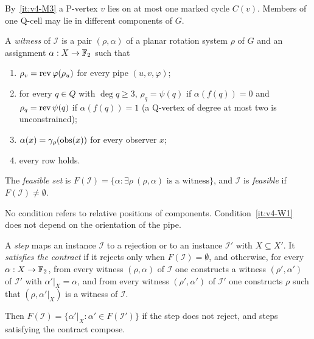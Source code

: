 By~\ref{it:v4-M3} a P-vertex $v$ lies on at most one marked cycle $C(v)$.
Members of one Q-cell may lie in
different components of $G$.

\begin{definition}[witness]\label{def:v4-witness}
A \emph{witness} of $\mathcal I$ is a pair $(\rho,\alpha)$ of a planar
rotation system $\rho$ of $G$ and an assignment $\alpha:X\to\mathbb F_2$ such that
\begin{enumerate}[label=(W\arabic*),nosep]
\item\label{it:v4-W1} $\rho_v=\operatorname{rev}\varphi(\rho_u)$ for every pipe
  $(u,v,\varphi)$;
\item\label{it:v4-W2} for every $q\in Q$ with $\deg q\ge3$,
  $\rho_q=\psi(q)$ if $\alpha(f(q))=0$ and $\rho_q=\operatorname{rev}\psi(q)$ if
  $\alpha(f(q))=1$ (a Q-vertex of degree at most two is unconstrained);
\item\label{it:v4-W3} $\alpha(x)=\gamma_\rho(\operatorname{obs}(x))$ for every
  observer $x$;
\item\label{it:v4-W4} every row holds.
\end{enumerate}
The \emph{feasible set} is $F(\mathcal I)=\{\alpha:\exists\rho\
(\rho,\alpha)\text{ is a witness}\}$, and $\mathcal I$ is \emph{feasible} if
$F(\mathcal I)\ne\emptyset$.
\end{definition}

No condition refers to relative positions of components.
Condition~\ref{it:v4-W1} does not depend on the orientation of the pipe.

\begin{definition}[contract]\label{def:v4-contract}
A \emph{step} maps an instance $\mathcal I$ to a rejection or to an instance
$\mathcal I'$ with $X\subseteq X'$. It \emph{satisfies the contract} if it
rejects only when $F(\mathcal I)=\emptyset$, and otherwise, for every
$\alpha:X\to\mathbb F_2$, from every witness $(\rho,\alpha)$ of $\mathcal I$ one
constructs a witness $(\rho',\alpha')$ of $\mathcal I'$ with
$\alpha'|_X=\alpha$, and from every witness $(\rho',\alpha')$ of
$\mathcal I'$ one constructs $\rho$ such that $(\rho,\alpha'|_X)$ is a
witness of $\mathcal I$.
\end{definition}

Then $F(\mathcal I)=\{\alpha'|_X:\alpha'\in F(\mathcal I')\}$ if the step
does not reject, and steps satisfying the contract compose.

